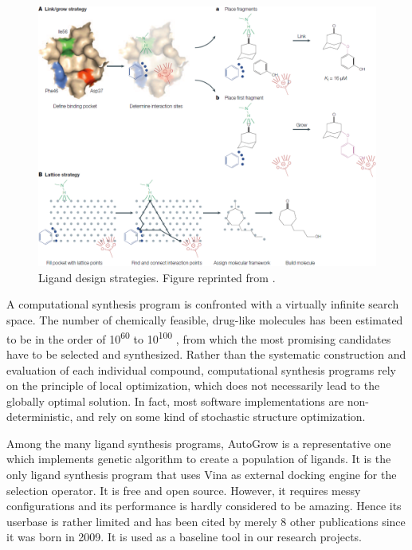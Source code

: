 \begin{figure}[t]
\centering
\includegraphics[width=\textwidth]{Figures/LigandDesign.png}
\caption{Ligand design strategies. Figure reprinted from \citep{363}.}
\label{fig:LigandDesign}
\end{figure}

A computational synthesis program is confronted with a virtually infinite search space. The number of chemically feasible, drug-like molecules has been estimated to be in the order of 10\textsuperscript{60} to 10\textsuperscript{100} \citep{363}, from which the most promising candidates have to be selected and synthesized. Rather than the systematic construction and evaluation of each individual compound, computational synthesis programs rely on the principle of local optimization, which does not necessarily lead to the globally optimal solution. In fact, most software implementations \citep{466,749} are non-deterministic, and rely on some kind of stochastic structure optimization.

Among the many ligand synthesis programs, AutoGrow \citep{466} is a representative one which implements genetic algorithm to create a population of ligands. It is the only ligand synthesis program that uses Vina \citep{595} as external docking engine for the selection operator. It is free and open source. However, it requires messy configurations and its performance is hardly considered to be amazing. Hence its userbase is rather limited and has been cited by merely 8 other publications since it was born in 2009. It is used as a baseline tool in our research projects.


